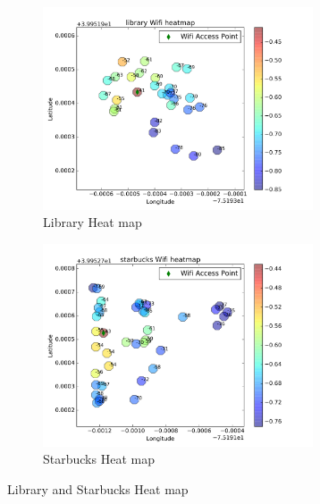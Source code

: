 \documentclass[usletter,12pt]{article}
\begin{document}
\begin{figure}[!h]
	\begin{subfigure}{0.5\textwidth}
		\centering
		\includegraphics[width=1\linewidth, height=6cm]{library.png} 
		\caption{Library Heat map}
	\end{subfigure}
	\begin{subfigure}{0.5\textwidth}
	    \centering
		\includegraphics[width=1\linewidth, height=6cm]{starbucks.png}
		\caption{Starbucks Heat map}
	\end{subfigure}
	\caption{Library and Starbucks Heat map}
	\label{fig:plot7&8}
\end{figure}
\end{document}
